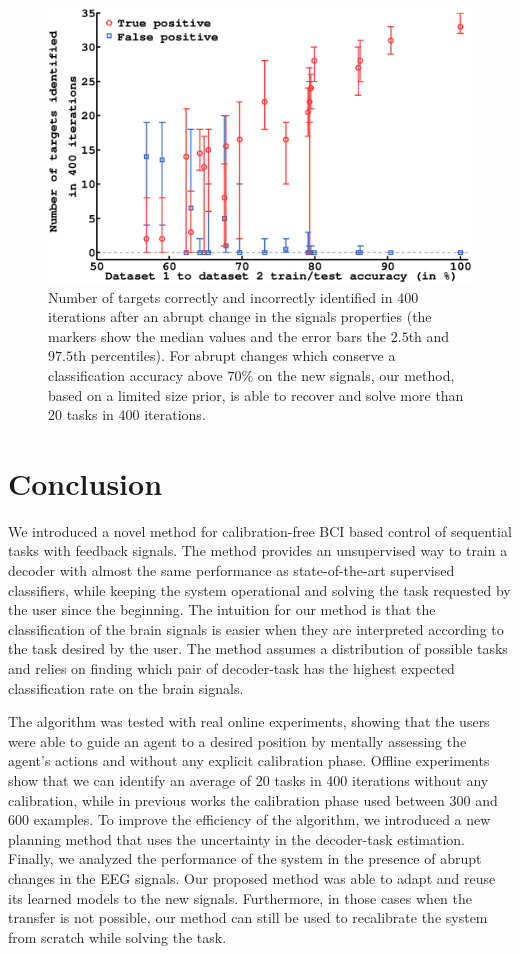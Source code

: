 \documentclass[letterpaper]{article}
\newcommand{\ww}{0.9}
\begin{document}
\begin{figure}[!ht]
    \centering
    \includegraphics[width=\ww\columnwidth]{img/plot_last400_reach}
    \caption{Number of targets correctly and incorrectly identified in $400$ iterations after an abrupt change in the signals properties (the markers show the median values and the error bars the $2.5$th and $97.5$th percentiles). For abrupt changes which conserve a classification accuracy above $70\%$ on the new signals, our method, based on a limited size prior, is able to recover and solve more than $20$ tasks in $400$ iterations.}
    \label{fig:stage2}
\end{figure}

\section{Conclusion}

We introduced a novel method for calibration-free BCI based control of sequential tasks with feedback signals. The method provides an unsupervised way to train a decoder with almost the same performance as state-of-the-art supervised classifiers, while keeping the system operational and solving the task requested by the user since the beginning. 
%
The intuition for our method is that the classification of the brain signals is easier when they are interpreted according to the task desired by the user. The method assumes a distribution of possible tasks and relies on finding which pair of decoder-task has the highest expected classification rate on the brain signals. 


The algorithm was tested with real online experiments, showing that the users were able to guide an agent to a desired position by mentally assessing the agent's actions and without any explicit calibration phase. Offline experiments show that we can identify an average of 20 tasks in 400 iterations without any calibration, while in previous works the calibration phase used between 300 and 600 examples. To improve the efficiency of the algorithm, we introduced a new planning method that uses the uncertainty in the decoder-task estimation. Finally, we analyzed the performance of the system in the presence of abrupt changes in the EEG signals. Our proposed method was able to adapt and reuse its learned models to the new signals. Furthermore, in those cases when the transfer is not possible, our method can still be used to recalibrate the system from scratch while solving the task.
\end{document}
